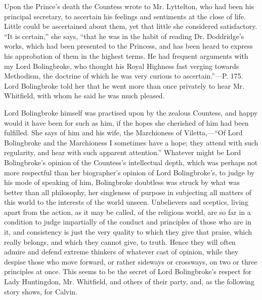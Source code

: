 Upon the Prince's death the Countess wrote to Mr.
Lyttelton, who had been his principal secretary, to ascertain his
feelings and sentiments at the close of life. Little could be
ascertained about them, yet that little she considered satisfactory. ``It
is certain,'' she says, ``that he was in the habit of reading Dr.
Doddridge's works, which had been presented to the Princess, and has
been heard to express his approbation of them in the highest terms. He
had frequent arguments with my Lord Bolingbroke, who thought his Royal
Highness fast verging towards Methodism, the doctrine of which he was
very curious to ascertain.''—P. 175. Lord Bolingbroke told her that
he went more than once privately to hear Mr. Whitfield, with whom he
said he was much pleased.

Lord Bolingbroke himself was practised upon by
the zealous Countess, and happy would it have been for such as him, if
the hopes she cherished of him had been fulfilled. She says of him and
his wife, the Marchioness of Viletta,—``Of Lord Bolingbroke and the
Marchioness I sometimes have a hope; they attend with such
regularity, and hear with such apparent attention.'' Whatever might be
Lord Bolingbroke's opinion of the Countess's intellectual depth, which
was perhaps not more respectful than her biographer's opinion of Lord
Bolingbroke's, to judge by his mode of speaking of him, Bolingbroke
doubtless was struck by what was better than all philosophy, her
singleness of purpose in subjecting all matters of this world to the
interests of the world unseen. Unbelievers and sceptics, living apart
from the action, as it may be called, of the religious world, are so
far in a condition to judge impartially of the conduct and principles
of those who are in it, and consistency is just the very quality to
which they give that praise, which really belongs, and which they
cannot give, to truth. Hence they will often admire and defend extreme
thinkers of whatever cast of opinion, while they despise those who
move forward, or rather sideways or crossways, on two or three
principles at once. This seems to be the secret of Lord Bolingbroke's
respect for Lady Huntingdon, Mr. Whitfield, and others of their party,
and, as the following story shows, for Calvin.

